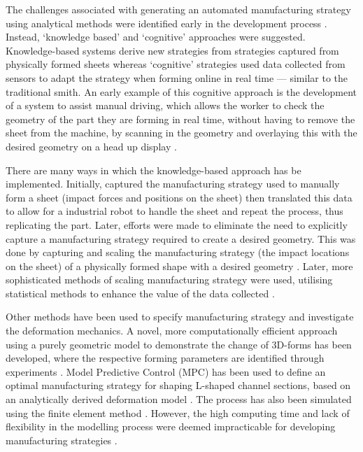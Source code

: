 The challenges associated with generating an automated manufacturing strategy using analytical methods were identified early in the development process \citep{Golle2007DrivingProducts}. Instead, `knowledge based' and `cognitive' approaches were suggested. Knowledge-based systems derive new strategies from strategies captured from physically formed sheets whereas `cognitive' strategies used data collected from sensors to adapt the strategy when forming online in real time --- similar to the traditional smith. An early example of this cognitive approach is the development of a system to assist manual driving, which allows the worker to check the geometry of the part they are forming in real time, without having to remove the sheet from the machine, by scanning in the geometry and overlaying this with the desired geometry on a head up display \citep{Scherer2010DrivingProducts}.

There are many ways in which the knowledge-based approach has be implemented. Initially, \cite{Hoffman2009AnHandling} captured the manufacturing strategy used to manually form a sheet (impact forces and positions on the sheet) then translated this data to allow for a industrial robot to handle the sheet and repeat the process, thus replicating the part. %
Later, efforts were made to eliminate the need to explicitly capture a manufacturing strategy required to create a desired geometry. This was done by capturing and scaling the manufacturing strategy (the impact locations on the sheet) of a physically formed shape with a desired geometry \citep{Opritescu2012AutomatedStrategy}. Later, more sophisticated methods of scaling manufacturing strategy were used, utilising statistical methods to enhance the value of the data collected \citep{Opritescu2016VariationVariance,Hartmann2019Knowledge-basedPartitioning}.

Other methods have been used to specify manufacturing strategy and investigate the deformation mechanics. A novel, more computationally efficient approach using a purely geometric model to demonstrate the change of 3D-forms has been developed, where the respective forming parameters are identified through experiments \citep{Yang2011GeometricalProcess}. Model Predictive Control (MPC) has been used to define an optimal manufacturing strategy for shaping L-shaped channel sections, based on an analytically derived deformation model \citep{Yang2009AutomatisierungProgramming}. The process has also been simulated using the finite element method \citep{Hoffmann2005StudiesMetal}. However, the high computing time and lack of flexibility in the modelling process were deemed impracticable for developing manufacturing strategies \citep{Scherer2013MethodenBlechumformung}. 

